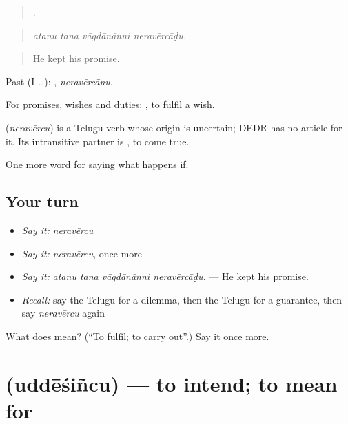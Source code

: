 \begin{quote}
   .
\end{quote}

\begin{quote}
\emph{atanu tana vāgdānānni neravērcāḍu.}
\end{quote}

\begin{quote}
He kept his promise.
\end{quote}

Past (I …): , \emph{neravērcānu}.

For promises, wishes and duties:  , to fulfil a wish.

\begin{cousinweb}
\textbf{} (\emph{neravērcu}) is a Telugu verb whose origin is uncertain; DEDR has no article for it. Its intransitive partner is , to come true.
\end{cousinweb}

\begin{grammarlens}[title={What you've built}]
One more word for saying what happens if.
\end{grammarlens}

\subsection*{Your turn}
\begin{itemize}
\raggedright
  \item \emph{Say it:} \emph{neravērcu}
  \item \emph{Say it:} \emph{neravērcu}, once more
  \item \emph{Say it:} \emph{atanu tana vāgdānānni neravērcāḍu.} — He kept his promise.
  \item \emph{Recall:} say the Telugu for a dilemma, then the Telugu for a guarantee, then say \emph{neravērcu} again
\end{itemize}

\begin{tcolorbox}[breakable,colback=teal!4,colframe=teal!35!black,title={Before you move on}]
What does  mean? (\textquotedblleft{}To fulfil; to carry out\textquotedblright{}.) Say it once more.
\end{tcolorbox}
\section[\texorpdfstring{\te{ఉద్దేశించు} (uddēśiñcu)}{ఉద్దేశించు (uddēśiñcu)}]{ (uddēśiñcu) — to intend; to mean for}

